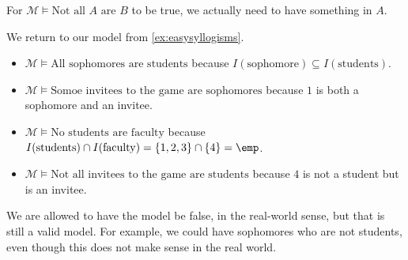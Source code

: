 \begin{remark}
	For $\mathcal M\models\textrm{Not all }A\textrm{ are }B$ to be true, we actually need to have something in $A$.
\end{remark}
\begin{example}
	We return to our model from \autoref{ex:easysyllogisms}.
	\begin{itemize}
		\item $\mathcal M\models\textrm{All sophomores are students}$ because $I(\mathrm{sophomore})\subseteq I(\mathrm{students})$.
		\item $\mathcal M\models\textrm{Somoe invitees to the game are sophomores}$ because $1$ is both a sophomore and an invitee.
		\item $\mathcal M\models\textrm{No students are faculty}$ because $I(\mathrm{students})\cap I(\mathrm{faculty})=\{1,2,3\}\cap\{4\}=\emp$.
		\item $\mathcal M\models\textrm{Not all invitees to the game are students}$ because $4$ is not a student but is an invitee.
	\end{itemize}
\end{example}
\begin{remark}
	We are allowed to have the model be false, in the real-world sense, but that is still a valid model. For example, we could have sophomores who are not students, even though this does not make sense in the real world.
\end{remark}

